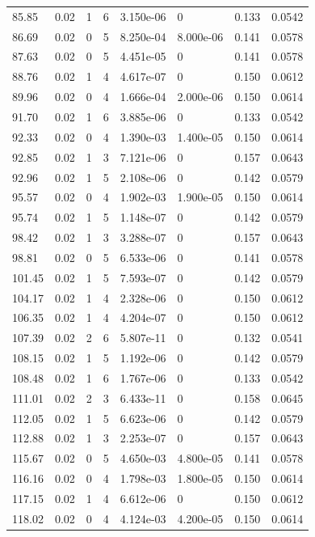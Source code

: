 \documentclass[preview]{standalone}
\begin{document}
{{{\begin{tabular}{L{1.2cm}C{1.2cm} C{0.3cm}C{0.5cm} C{1.4cm}C{1.4cm} C{1.4cm}C{1.4cm}}
  85.85  &  0.02  & 1     &  6 &  3.150e-06  & 0  & 0.133 &  0.0542   \\ 
  86.69  &  0.02  & 0     &  5 &  8.250e-04  & 8.000e-06  & 0.141 &  0.0578   \\ 
  87.63  &  0.02  & 0     &  5 &  4.451e-05  & 0  & 0.141 &  0.0578   \\ 
  88.76  &  0.02  & 1     &  4 &  4.617e-07  & 0  & 0.150 &  0.0612   \\ 
  89.96  &  0.02  & 0     &  4 &  1.666e-04  & 2.000e-06  & 0.150 &  0.0614   \\ 
  91.70  &  0.02  & 1     &  6 &  3.885e-06  & 0  & 0.133 &  0.0542   \\ 
  92.33  &  0.02  & 0     &  4 &  1.390e-03  & 1.400e-05  & 0.150 &  0.0614   \\ 
  92.85  &  0.02  & 1     &  3 &  7.121e-06  & 0  & 0.157 &  0.0643   \\ 
  92.96  &  0.02  & 1     &  5 &  2.108e-06  & 0  & 0.142 &  0.0579   \\ 
  95.57  &  0.02  & 0     &  4 &  1.902e-03  & 1.900e-05  & 0.150 &  0.0614   \\ 
  95.74  &  0.02  & 1     &  5 &  1.148e-07  & 0  & 0.142 &  0.0579   \\ 
  98.42  &  0.02  & 1     &  3 &  3.288e-07  & 0  & 0.157 &  0.0643   \\ 
  98.81  &  0.02  & 0     &  5 &  6.533e-06  & 0  & 0.141 &  0.0578   \\ 
  101.45  &  0.02  & 1     &  5 &  7.593e-07  & 0  & 0.142 &  0.0579   \\ 
  104.17  &  0.02  & 1     &  4 &  2.328e-06  & 0  & 0.150 &  0.0612   \\ 
  106.35  &  0.02  & 1     &  4 &  4.204e-07  & 0  & 0.150 &  0.0612   \\ 
  107.39  &  0.02  & 2     &  6 &  5.807e-11  & 0  & 0.132 &  0.0541   \\ 
  108.15  &  0.02  & 1     &  5 &  1.192e-06  & 0  & 0.142 &  0.0579   \\ 
  108.48  &  0.02  & 1     &  6 &  1.767e-06  & 0  & 0.133 &  0.0542   \\ 
  111.01  &  0.02  & 2     &  3 &  6.433e-11  & 0  & 0.158 &  0.0645   \\ 
  112.05  &  0.02  & 1     &  5 &  6.623e-06  & 0  & 0.142 &  0.0579   \\ 
  112.88  &  0.02  & 1     &  3 &  2.253e-07  & 0  & 0.157 &  0.0643   \\ 
  115.67  &  0.02  & 0     &  5 &  4.650e-03  & 4.800e-05  & 0.141 &  0.0578   \\ 
  116.16  &  0.02  & 0     &  4 &  1.798e-03  & 1.800e-05  & 0.150 &  0.0614   \\ 
  117.15  &  0.02  & 1     &  4 &  6.612e-06  & 0  & 0.150 &  0.0612   \\ 
  118.02  &  0.02  & 0     &  4 &  4.124e-03  & 4.200e-05  & 0.150 &  0.0614   \\ 
\hline 
\end{tabular} 

}}}
\end{document}
